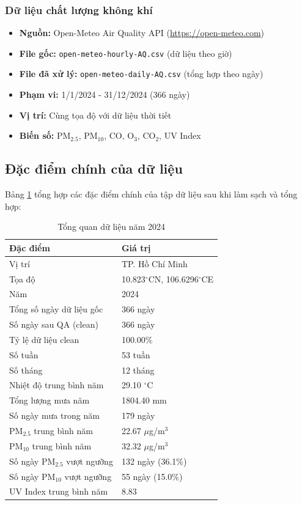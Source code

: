 \documentclass[12pt,a4paper]{article}
\newcommand{\ugm}{$\mu$g/m$^3$}
\newcommand{\degreec}{$^\circ$C}
\newcommand{\ozone}{O$_3$}
\newcommand{\cotwo}{CO$_2$}
\newcommand{\pmtwofive}{PM$_{2.5}$}
\newcommand{\pmten}{PM$_{10}$}
\begin{document}
\subsubsection{Dữ liệu chất lượng không khí}
\begin{itemize}
    \item \textbf{Nguồn:} Open-Meteo Air Quality API (\url{https://open-meteo.com})
    \item \textbf{File gốc:} \texttt{open-meteo-hourly-AQ.csv} (dữ liệu theo giờ)
    \item \textbf{File đã xử lý:} \texttt{open-meteo-daily-AQ.csv} (tổng hợp theo ngày)
    \item \textbf{Phạm vi:} 1/1/2024 - 31/12/2024 (366 ngày)
    \item \textbf{Vị trí:} Cùng tọa độ với dữ liệu thời tiết
    \item \textbf{Biến số:} \pmtwofive{}, \pmten{}, CO, \ozone{}, \cotwo{}, UV Index
\end{itemize}

\subsection{Đặc điểm chính của dữ liệu}

Bảng \ref{tab:data-overview} tổng hợp các đặc điểm chính của tập dữ liệu sau khi làm sạch và tổng hợp:

\begin{table}[H]
\centering
\caption{Tổng quan dữ liệu năm 2024}
\label{tab:data-overview}
\begin{tabular}{ll}
\toprule
\textbf{Đặc điểm} & \textbf{Giá trị} \\
\midrule
Vị trí & TP. Hồ Chí Minh \\
Tọa độ & 10.823\degreec{}N, 106.6296\degreec{}E \\
Năm & 2024 \\
\midrule
Tổng số ngày dữ liệu gốc & 366 ngày \\
Số ngày sau QA (clean) & 366 ngày \\
Tỷ lệ dữ liệu clean & 100.00\% \\
Số tuần & 53 tuần \\
Số tháng & 12 tháng \\
\midrule
Nhiệt độ trung bình năm & 29.10 \degreec{} \\
Tổng lượng mưa năm & 1804.40 mm \\
Số ngày mưa trong năm & 179 ngày \\
\midrule
\pmtwofive{} trung bình năm & 22.67 \ugm{} \\
\pmten{} trung bình năm & 32.32 \ugm{} \\
Số ngày \pmtwofive{} vượt ngưỡng & 132 ngày (36.1\%) \\
Số ngày \pmten{} vượt ngưỡng & 55 ngày (15.0\%) \\
UV Index trung bình năm & 8.83 \\
\bottomrule
\end{tabular}
\end{table}
\end{document}
